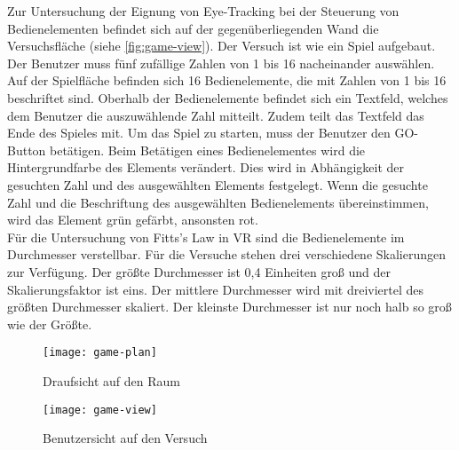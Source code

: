 Zur Untersuchung der Eignung von Eye-Tracking bei der Steuerung von Bedienelementen befindet sich auf der gegenüberliegenden Wand die Versuchsfläche (siehe \autoref{fig:game-view}). Der Versuch ist wie ein Spiel aufgebaut. Der Benutzer muss fünf zufällige  Zahlen von 1 bis 16 nacheinander auswählen. Auf der Spielfläche befinden sich 16 Bedienelemente, die mit Zahlen von 1 bis 16 beschriftet sind. Oberhalb der Bedienelemente befindet sich ein Textfeld, welches dem Benutzer die auszuwählende Zahl mitteilt. Zudem teilt das Textfeld das Ende des Spieles mit. Um das Spiel zu starten, muss der Benutzer den GO-Button betätigen. Beim Betätigen eines Bedienelementes wird die Hintergrundfarbe des Elements verändert. Dies wird in Abhängigkeit der gesuchten Zahl und des ausgewählten Elements festgelegt. Wenn die gesuchte Zahl und die Beschriftung des ausgewählten Bedienelements übereinstimmen, wird das Element grün gefärbt, ansonsten rot. \\
Für die Untersuchung von Fitts's Law in \ac{VR} sind die Bedienelemente im Durchmesser verstellbar. Für die Versuche stehen drei verschiedene Skalierungen zur Verfügung. Der größte Durchmesser ist 0,4 Einheiten groß und der Skalierungsfaktor ist eins. Der mittlere Durchmesser wird mit dreiviertel des größten Durchmesser skaliert. Der kleinste Durchmesser ist nur noch halb so groß wie der Größte.

\begin{figure}[!htbp]
	\centering
	\texttt{[image: game-plan]}
	\caption[Draufsicht auf den Raum]{Draufsicht auf den Raum}
	\label{fig:game-plan}
\end{figure}

\begin{figure}[!htbp]
\centering
\texttt{[image: game-view]}
\caption[Benutzersicht auf den Versuch]{Benutzersicht auf den Versuch}
\label{fig:game-view}
\end{figure}

